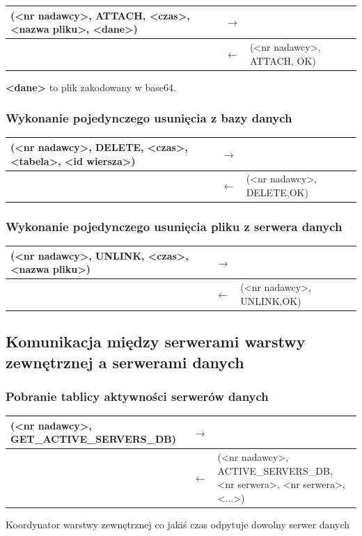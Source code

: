 \begin{longtable}{| p{} | p{}| p{} |} 
\hline
(<nr nadawcy>, ATTACH, <czas>, <nazwa pliku>, <dane>) & $\rightarrow$ &  \\ \hline
 & $\leftarrow$ & (<nr nadawcy>, ATTACH, OK) \\ \hline
\end{longtable}
\textbf{<dane>} to plik zakodowany w base64.

\subsubsection{Wykonanie pojedynczego usunięcia z bazy danych}

\begin{longtable}{| p{} | p{}| p{} |} 
\hline
(<nr nadawcy>, DELETE, <czas>, <tabela>, <id wiersza>) & $\rightarrow$ &  \\ \hline
 & $\leftarrow$ & (<nr nadawcy>, DELETE,OK) \\ \hline
\end{longtable}

\subsubsection{Wykonanie pojedynczego usunięcia pliku z serwera danych}

\begin{longtable}{| p{} | p{}| p{} |} 
\hline
(<nr nadawcy>, UNLINK, <czas>, <nazwa pliku>) & $\rightarrow$ &  \\ \hline
 & $\leftarrow$ & (<nr nadawcy>, UNLINK,OK) \\ \hline
\end{longtable}

\subsection{Komunikacja między serwerami warstwy zewnętrznej a serwerami danych}

\subsubsection{Pobranie tablicy aktywności serwerów danych}

\begin{longtable}{| p{} | p{}| p{} |} 
\hline
(<nr nadawcy>, GET\_ACTIVE\_SERVERS\_DB) & $\rightarrow$ &  \\ \hline
 & $\leftarrow$ & (<nr nadawcy>, ACTIVE\_SERVERS\_DB, <nr serwera>, <nr serwera>, <...>) \\ \hline
\end{longtable}
Koordynator warstwy zewnętrznej co jakiś czas odpytuje dowolny serwer danych

